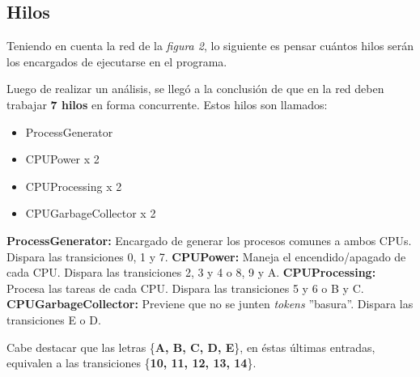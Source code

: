 \documentclass{article}
\begin{document}
    \subsection{Hilos}
    Teniendo en cuenta la red de la \emph{figura 2}, lo siguiente es pensar cuántos hilos
    serán los encargados de ejecutarse en el programa. \par
    Luego de realizar un análisis, se llegó a la conclusión de que en la red deben trabajar
    \textbf{7 hilos} en forma concurrente. Estos hilos son llamados:
    \begin{itemize}
        \item ProcessGenerator
        \item CPUPower x 2
        \item CPUProcessing x 2
        \item CPUGarbageCollector x 2
    \end{itemize}
    \textbf{ProcessGenerator:} Encargado de generar los procesos comunes a ambos CPUs.
    Dispara las transiciones 0, 1 y 7. \newline \newline
    \textbf{CPUPower:} Maneja el encendido/apagado de cada CPU. Dispara las transiciones
    2, 3 y 4 o 8, 9 y A. \newline \newline
    \textbf{CPUProcessing:} Procesa las tareas de cada CPU. Dispara las transiciones
    5 y 6 o B y C. \newline \newline
    \textbf{CPUGarbageCollector:} Previene que no se junten \emph{tokens} ''basura''. 
    Dispara las transiciones E o D.\newline \par
    Cabe destacar que las letras \{\textbf{A, B, C, D, E}\}, en éstas últimas entradas, 
    equivalen a las transiciones \{\textbf{10, 11, 12, 13, 14}\}. 
\end{document}
